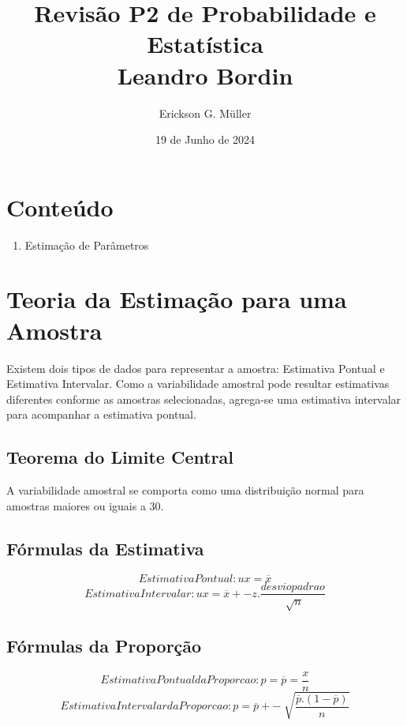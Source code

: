 \documentclass[ ]{article}
\title{Revisão P2 de Probabilidade e Estatística \\ Leandro Bordin}
\author{Erickson G. Müller}
\date{19 de Junho de 2024}
\begin{document}
\maketitle
\section{Conteúdo}
\begin{enumerate}
	\item Estimação de Parâmetros
\end{enumerate}
\pagebreak

\section{Teoria da Estimação para uma Amostra}
	Existem dois tipos de dados para representar a amostra: Estimativa Pontual e Estimativa Intervalar. Como a variabilidade amostral pode resultar estimativas diferentes conforme as amostras selecionadas, agrega-se uma estimativa intervalar para acompanhar a estimativa pontual.

\subsection{Teorema do Limite Central}	
	A variabilidade amostral se	 comporta como uma distribuição normal para amostras maiores ou iguais a 30.

\subsection{Fórmulas da Estimativa}
	\begin{equation*}
		Estimativa Pontual: ux = \overline{x}
	\end{equation*}
	\begin{equation*}
		Estimativa Intervalar: ux = \overline{x} +- z.\dfrac{desvio padrao}{\sqrt[]{n}}
	\end{equation*}	
\subsection{Fórmulas da Proporção}
	\begin{equation*}
		Estimativa Pontual da Proporcao: p = \overline{p} = \dfrac{x}{n}
	\end{equation*}
	\begin{equation*}
		Estimativa Intervalar da Proporcao: p = \overline{p} +- \sqrt[]{\dfrac{\overline{p}.(1-\overline{p})}{n}}
	\end{equation*}
\end{document}
